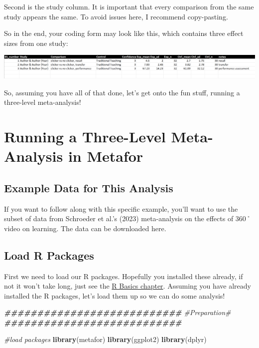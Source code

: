 \documentclass[
]{book}
\newenvironment{Shaded}{\begin{snugshade}}{\end{snugshade}}
\newcommand{\CommentTok}[1]{\textcolor[rgb]{0.56,0.35,0.01}{\textit{#1}}}
\newcommand{\DocumentationTok}[1]{\textcolor[rgb]{0.56,0.35,0.01}{\textbf{\textit{#1}}}}
\newcommand{\FunctionTok}[1]{\textcolor[rgb]{0.13,0.29,0.53}{\textbf{#1}}}
\newcommand{\NormalTok}[1]{#1}
\begin{document}
Second is the study column. It is important that every comparison from the same study appears the same. To avoid issues here, I recommend copy-pasting.

So in the end, your coding form may look like this, which contains three effect sizes from one study:

\includegraphics[width=2\textwidth,height=\textheight]{images/3lmacoding.PNG}

So, assuming you have all of that done, let's get onto the fun stuff, running a three-level meta-analysis!

\hypertarget{running-a-three-level-meta-analysis-in-metafor}{%
\section{Running a Three-Level Meta-Analysis in Metafor}\label{running-a-three-level-meta-analysis-in-metafor}}

\hypertarget{example-data-for-this-analysis-1}{%
\subsection{Example Data for This Analysis}\label{example-data-for-this-analysis-1}}

If you want to follow along with this specific example, you'll want to use the subset of data from Schroeder et al.'s (2023)\citep{schroeder2023} meta-analysis on the effects of 360˚ video on learning. The data can be downloaded here.

\hypertarget{load-r-packages-1}{%
\subsection{Load R Packages}\label{load-r-packages-1}}

First we need to load our R packages. Hopefully you installed these already, if not it won't take long, just see the \protect\hyperlink{crossrpackages}{R Basics chapter}. Assuming you have already installed the R packages, let's load them up so we can do some analysis!

\begin{Shaded}
\begin{Highlighting}[]
\DocumentationTok{\#\#\#\#\#\#\#\#\#\#\#\#\#\#\#\#\#\#\#\#\#\#\#\#\#\#\#}
\CommentTok{\#Preparation\#}
\DocumentationTok{\#\#\#\#\#\#\#\#\#\#\#\#\#\#\#\#\#\#\#\#\#\#\#\#\#\#\#}

\CommentTok{\#load packages}
\FunctionTok{library}\NormalTok{(metafor)}
\FunctionTok{library}\NormalTok{(ggplot2)}
\FunctionTok{library}\NormalTok{(dplyr)}
\end{Highlighting}
\end{Shaded}
\end{document}
